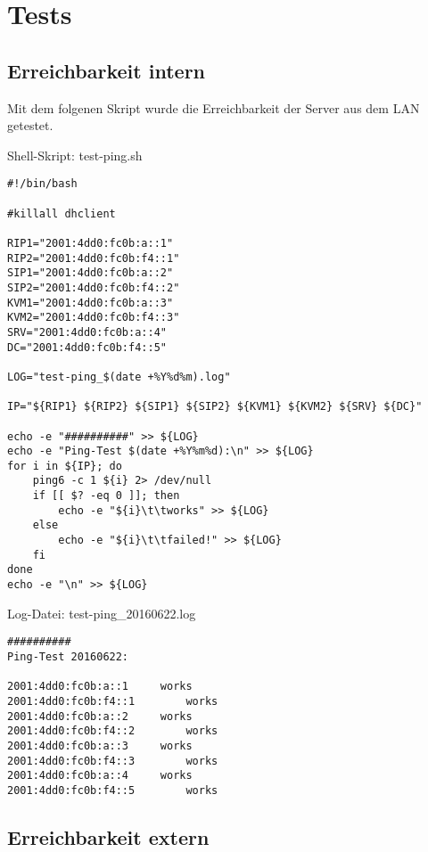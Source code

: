 \section{Tests}

\subsection{Erreichbarkeit intern}

Mit dem folgenen Skript wurde die Erreichbarkeit der Server aus dem LAN getestet.

Shell-Skript: {\sc test-ping.sh}
\begin{lstlisting}
#!/bin/bash

#killall dhclient

RIP1="2001:4dd0:fc0b:a::1"
RIP2="2001:4dd0:fc0b:f4::1"
SIP1="2001:4dd0:fc0b:a::2"
SIP2="2001:4dd0:fc0b:f4::2"
KVM1="2001:4dd0:fc0b:a::3"
KVM2="2001:4dd0:fc0b:f4::3"
SRV="2001:4dd0:fc0b:a::4"
DC="2001:4dd0:fc0b:f4::5"

LOG="test-ping_$(date +%Y%d%m).log"

IP="${RIP1} ${RIP2} ${SIP1} ${SIP2} ${KVM1} ${KVM2} ${SRV} ${DC}"

echo -e "##########" >> ${LOG}
echo -e "Ping-Test $(date +%Y%m%d):\n" >> ${LOG}
for i in ${IP}; do
	ping6 -c 1 ${i} 2> /dev/null
	if [[ $? -eq 0 ]]; then
		echo -e "${i}\t\tworks" >> ${LOG}
	else
		echo -e "${i}\t\tfailed!" >> ${LOG}
	fi
done	
echo -e "\n" >> ${LOG}
\end{lstlisting}

Log-Datei: {\sc test-ping_20160622.log}
\begin{lstlisting}
##########
Ping-Test 20160622:

2001:4dd0:fc0b:a::1		works
2001:4dd0:fc0b:f4::1		works
2001:4dd0:fc0b:a::2		works
2001:4dd0:fc0b:f4::2		works
2001:4dd0:fc0b:a::3		works
2001:4dd0:fc0b:f4::3		works
2001:4dd0:fc0b:a::4		works
2001:4dd0:fc0b:f4::5		works
\end{lstlisting}

\subsection{Erreichbarkeit extern}
